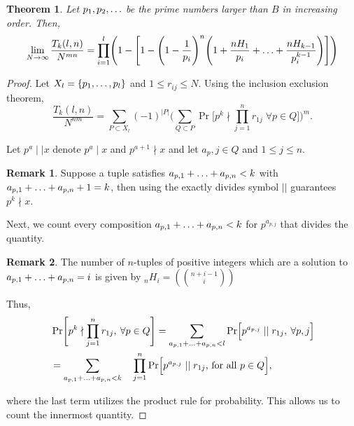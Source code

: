 \documentclass[12pt]{amsart}
\newtheorem{theorem}{Theorem}[subsection]
\theoremstyle{definition}
\newtheorem*{remark}{Remark}
\begin{document}
\begin{theorem}
	Let \(p_1, p_2,\mathellipsis\) be the prime numbers larger than \(B\) in increasing order. Then,
	\begin{equation*}
		\lim\limits_{N\to\infty} \frac{T_k(l,n)}{N^{mn}}=\prod_{i=1}^l\Biggl(1-\Biggl[1-\Biggl(1-\frac{1}{p_i}\Biggr)^n\Biggl(1+\frac{nH_1}{p_i}+\mathellipsis+\frac{nH_{k-1}}{p_i^{k-1}}\Biggr)\Biggr]\Biggr)
	\end{equation*}
\end{theorem}

\begin{proof}
	Let \(X_l=\{p_1,\mathellipsis,p_l\}\) and \(1\leq r_{ij}\leq N\). Using the inclusion exclusion theorem, 
	\begin{equation*}
		\frac{T_k(l,n)}{N^{nm}}=\sum_{P\subset X_l}(-1)^{|P|}\Biggl(\sum_{Q\subset P}\Pr\Biggl[p^k\nmid \prod_{j=1}^{n}r_{1j} \; \forall p\in Q \Biggr]\Biggr)^m.
	\end{equation*}
	
	Let \(p^a \mid\mid x\) denote \(p^a\mid x\) and \(p^{a+1}\nmid x\) and let \(a_p,j\in Q\) and \(1\leq j \leq n\).
	
	\begin{remark}
		Suppose a tuple satisfies \(a_{p,1}+\mathellipsis+a_{p,n}<k\) with \(a_{p,1}+\mathellipsis+a_{p,n}+1=k\), then using the exactly divides symbol \(||\) guarantees \(p^k \nmid x\).
	\end{remark} 
	
	Next, we count every composition \(a_{p,1}+\mathellipsis+a_{p,n}<k\) for \(p^{a_{p,j}}\) that divides the quantity. 
	\begin{remark}
	   The number of \(n\)-tuples of positive integers which are a solution to \(a_{p,1}+\mathellipsis+a_{p,n}=i\) is given by \(_nH_i = (\binom{n+i-1}{i})\)
	\end{remark}

	Thus,
        \begin{align*}
		&\Pr\Biggl[p^k\nmid \prod_{j=1}^{n}r_{1j},\:\forall p\in Q\Biggr] = \sum_{a_{p,1}+\mathellipsis+a_{p,n}<l}\Pr\Bigl[p^{a_{p,j}} \mid\mid r_{1j},\: \forall p,j\Bigr]\\
		&=\sum_{a_{p,1}+\mathellipsis+a_{p,n}<k}\quad\prod_{j=1}^{n}\Pr\Bigl[p^{a_{p,j}} \mid\mid r_{1j} \text{, for all } p\in Q\Bigr],  
	\end{align*}
	
	\noindent where the last term utilizes the product rule for probability. This allows us to count the innermost quantity. 
	

\end{proof}
\end{document}
